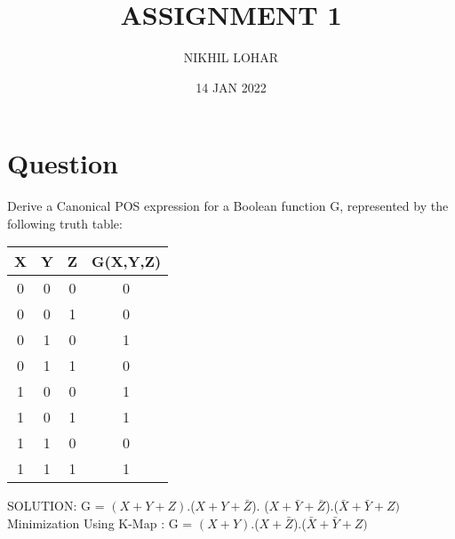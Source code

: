 \documentclass{article}
\title{ASSIGNMENT 1}
\author{NIKHIL LOHAR }
\date{ 14 JAN 2022}
\begin{document}
\maketitle

\section{Question }
Derive a Canonical POS expression for a Boolean function G, represented by the following truth table:

\begin{table} [h!]
    \centering
    \begin{tabular}{ | c | c | c | c | }
    \hline
    X & Y & Z & G(X,Y,Z) \\ [2ex]
    \hline
    0 & 0 & 0 & 0 \\
    0 & 0 & 1 & 0 \\
    0 & 1 & 0 & 1 \\
    0 & 1 & 1 & 0 \\
    1 & 0 & 0 & 1 \\
    1 & 0 & 1 & 1 \\
    1 & 1 & 0 & 0 \\
    1 & 1 & 1 & 1 \\[1ex]
    
     \hline
    \end{tabular}
    \end{table}
    
SOLUTION:  G = $(X + Y + Z)$.($X+Y+\bar{Z}$). ($X+\bar{Y}+\bar{Z}$).($\bar{X}+\bar{Y}+Z)$
Minimization Using K-Map : G =  $(X + Y )$.($X+\bar{Z}$).($\bar{X}+\bar{Y}+Z)$ 
\end{document}
